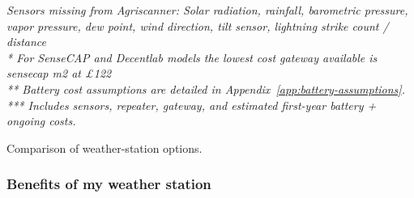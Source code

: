 \begin{table}[H]
\vspace{0.25em}
\textit{\footnotesize * Sensors missing from Agriscanner: Solar radiation,
rainfall, barometric pressure, vapor pressure, dew point, wind direction, tilt
sensor, lightning strike count / distance} \\
\textit{\footnotesize ** For SenseCAP and Decentlab models the lowest cost
gateway available is sensecap m2 at £122} \\
\textit{\footnotesize *** Battery cost assumptions are detailed in
Appendix~\ref{app:battery-assumptions}.} \\
\textit{\footnotesize **** Includes sensors, repeater, gateway, and estimated first-year battery + ongoing costs.}
\caption{Comparison of weather-station options.}
\label{tab:commercial-comparison}
\end{table}

\subsubsection{Benefits of my weather station}


